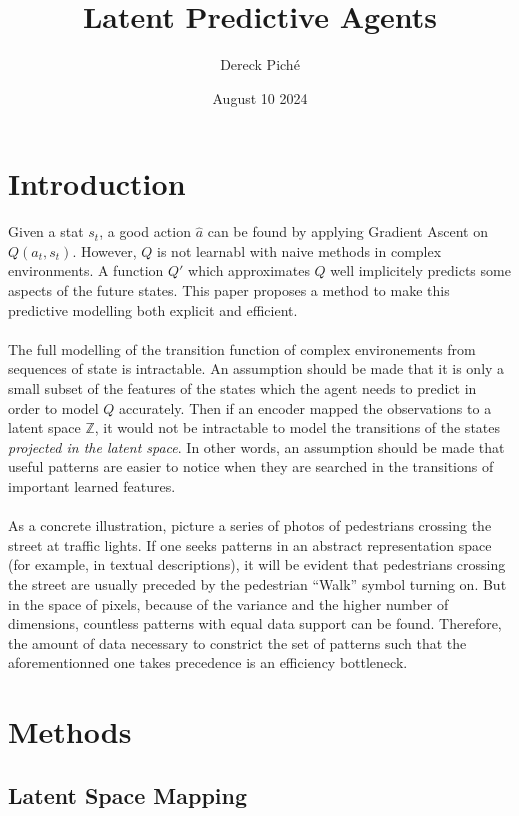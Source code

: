 \documentclass[]{article}
\title{Latent Predictive Agents}
\author{Dereck Piché}
\date{August 10 2024}
\begin{document}
\maketitle


\section{Introduction}

Given a stat $s_t$, a good action $\hat{a}$ can be found by applying Gradient Ascent on $Q(a_t, s_t)$. 
However, $Q$ is not learnabl with naive methods in complex environments.
A function $Q'$ which approximates $Q$ well implicitely predicts some aspects of the future states.
This paper proposes a method to make this predictive modelling both explicit and efficient.
\\ \\
The full modelling of the transition function of complex environements from sequences of state is intractable. 
An assumption should be made that it is only a small subset of the features of the states which the agent needs to predict in order to model $Q$ accurately. 
Then if an encoder mapped the observations to a latent space $\mathbb{Z}$, it would not be intractable to model the transitions of the states \textit{projected in the latent space}. 
In other words, an assumption should be made that useful patterns are easier to notice when they are searched in the transitions of important learned features.
\\  \\
As a concrete illustration, picture a series of photos of pedestrians crossing the street at traffic lights. If one seeks patterns in an abstract representation space (for example, in textual descriptions), it will be evident that pedestrians crossing the street are usually preceded by the pedestrian ``Walk'' symbol turning on. But in the space of pixels, because of the variance and the higher number of dimensions, countless patterns with equal data support can be found. Therefore, the amount of data necessary to constrict the set of patterns such that the aforementionned one takes precedence is an efficiency bottleneck.

\newpage
\section{Methods}

\subsection{Latent Space Mapping}
\end{document}
